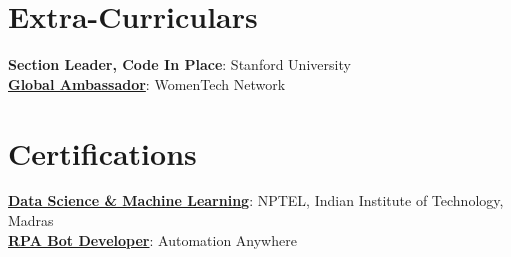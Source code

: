 \documentclass[12pt]{article}
\begin{document}
\section{Extra-Curriculars}
 \begin{itemize}[leftmargin=0.15in, label={}]
    \small{\item{
     \textbf{Section Leader, Code In Place}: Stanford University \\
     \textbf{\href{https://www.womentech.net/user/2294}{Global Ambassador}}: WomenTech Network
    }}
 \end{itemize}

\section{Certifications}
 \begin{itemize}[leftmargin=0.15in, label={}]
    \small{\item{
    \textbf{\href{https://drive.google.com/file/d/1v6m9e7gAltzsUzG6Fdkpsmyiv_AjjYLn/view?usp=sharing}{Data Science \& Machine Learning}}: NPTEL, Indian Institute of Technology, Madras \\
     \textbf{\href{https://certificates.automationanywhere.com/5aebc4c2-6f3d-4f6e-9c75-78654ecf079e}{RPA Bot Developer}}{: Automation Anywhere} \\
    }}
 \end{itemize}


\end{document}
